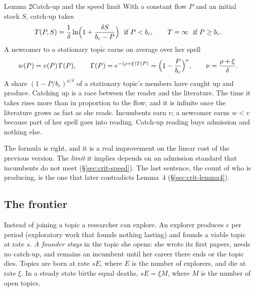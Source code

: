 \begin{resultbox}{Lemma 2}{Catch-up and the speed limit}{\tsolid}
With a constant flow $P$ and an initial stock $S$, catch-up takes
\[
T(P,S)=\frac1\delta\ln\Bigl(1+\frac{\delta S}{b_c-P}\Bigr)\ \text{ if } P<b_c,\qquad T=\infty\ \text{ if } P\ge b_c .
\]
A newcomer to a stationary topic earns on average over her spell
\[
w(P)=v(P)\,\Gamma(P),\qquad \Gamma(P)=e^{-(\rho+\xi)T(P)}=\Bigl(1-\frac{P}{b_c}\Bigr)^{\nu},\qquad \nu=\frac{\rho+\xi}{\delta}.
\]
A share $(1-P/b_c)^{\rho/\delta}$ of a stationary topic's members have caught up and produce.
\tcblower
\inwords Catching up is a race between the reader and the literature. The time it takes rises more than in proportion to the flow, and it is infinite once the literature grows as fast as she reads. Incumbents earn $v$; a newcomer earns $w<v$ because part of her spell goes into reading. Catch-up reading buys admission and nothing else.

\review The formula is right, and it is a real improvement on the linear cost of the previous version. The \emph{limit} it implies depends on an admission standard that incumbents do not meet (\S\ref{sec:crit-speed}). The last sentence, the count of who is producing, is the one that later contradicts Lemma~4 (\S\ref{sec:crit-lemma4}).
\end{resultbox}

\subsection{The frontier}

Instead of joining a topic a researcher can explore. An explorer produces $e$ per period (exploratory work that founds nothing lasting) and founds a viable topic at rate $s$. \emph{A founder stays} in the topic she opens: she wrote its first papers, needs no catch-up, and remains an incumbent until her career there ends or the topic dies. Topics are born at rate $sE$, where $E$ is the number of explorers, and die at rate $\xi$. In a steady state births equal deaths, $sE=\xi M$, where $M$ is the number of open topics.

